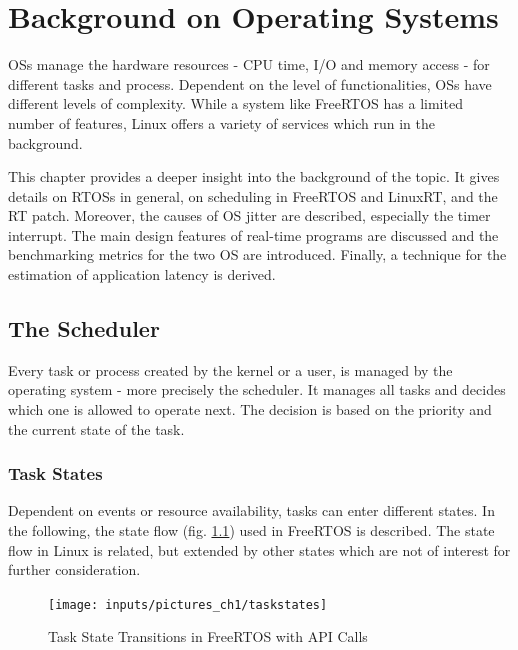 \chapter{Background on Operating Systems}\label{ch_background}
\acp{OS} manage the hardware resources - \ac{CPU} time, \ac{I/O} and memory access  - for different tasks and process. 
Dependent on the level of functionalities, \acp{OS} have different levels of complexity.
While a system like FreeRTOS has a limited number of features, Linux offers a variety of services which run in the background. 
\par
This chapter provides a deeper insight into the background of the topic. 
It gives details on \acp{RTOS} in general, on scheduling in FreeRTOS and LinuxRT, and the RT patch. 
Moreover, the causes of \ac{OS} jitter are described, especially the timer interrupt. 
The main design features of real-time programs are discussed and the benchmarking metrics for the two \ac{OS} are introduced. 
Finally, a technique for the estimation of application latency is derived.

\section{The Scheduler}\label{s_scheduler}
Every task or process created by the kernel or a user, is managed by the operating system - more precisely the scheduler. 
It manages all tasks and decides which one is allowed to operate next. 
The decision is based on the priority and the current state of the task. 

\subsection{Task States}\label{ss_task_states}
Dependent on events or resource availability, tasks can enter different states. 
In the following, the state flow (fig. \ref{fig_taskstates}) used in FreeRTOS \cite{freertos} is described. 
The state flow in Linux is related, but extended by other states which are not of interest for further consideration. 

\begin{figure}[htb]
	\begin{center}
		\texttt{[image: inputs/pictures\_ch1/taskstates]}
	\end{center}
	\caption[Task State Transitions in FreeRTOS]{Task State Transitions in FreeRTOS with API Calls \cite{freertos}} \label{fig_taskstates}
\end{figure}

